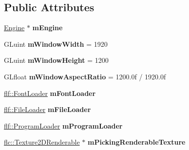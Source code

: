\subsection*{Public Attributes}
\begin{DoxyCompactItemize}
\item 
\hyperlink{classflw_1_1Engine}{Engine} $\ast$ {\bfseries m\+Engine}\hypertarget{structflw_1_1Engine_1_1EngineImpl_a9c64f8ee7c6ac8835080287ed3367c3f}{}\label{structflw_1_1Engine_1_1EngineImpl_a9c64f8ee7c6ac8835080287ed3367c3f}

\item 
G\+Luint {\bfseries m\+Window\+Width} = 1920\hypertarget{structflw_1_1Engine_1_1EngineImpl_aef610baed5ac54f136ecfdc97e1683aa}{}\label{structflw_1_1Engine_1_1EngineImpl_aef610baed5ac54f136ecfdc97e1683aa}

\item 
G\+Luint {\bfseries m\+Window\+Height} = 1200\hypertarget{structflw_1_1Engine_1_1EngineImpl_a9e20cc9b2d108f04c78fbc4471871e70}{}\label{structflw_1_1Engine_1_1EngineImpl_a9e20cc9b2d108f04c78fbc4471871e70}

\item 
G\+Lfloat {\bfseries m\+Window\+Aspect\+Ratio} = 1200.\+0f / 1920.\+0f\hypertarget{structflw_1_1Engine_1_1EngineImpl_a46ed363e1a45b86fb9390037b7fc70a6}{}\label{structflw_1_1Engine_1_1EngineImpl_a46ed363e1a45b86fb9390037b7fc70a6}

\item 
\hyperlink{classflw_1_1flf_1_1FontLoader}{flf\+::\+Font\+Loader} {\bfseries m\+Font\+Loader}\hypertarget{structflw_1_1Engine_1_1EngineImpl_aa2518f4952d54afbc00d0c929ffd415c}{}\label{structflw_1_1Engine_1_1EngineImpl_aa2518f4952d54afbc00d0c929ffd415c}

\item 
\hyperlink{classflw_1_1flf_1_1FileLoader}{flf\+::\+File\+Loader} {\bfseries m\+File\+Loader}\hypertarget{structflw_1_1Engine_1_1EngineImpl_afb036e6ebe80cb31685cef3755f400ce}{}\label{structflw_1_1Engine_1_1EngineImpl_afb036e6ebe80cb31685cef3755f400ce}

\item 
\hyperlink{classflw_1_1flf_1_1ProgramLoader}{flf\+::\+Program\+Loader} {\bfseries m\+Program\+Loader}\hypertarget{structflw_1_1Engine_1_1EngineImpl_a6d3acddc158c0d8d4a6a62539a1ebcdd}{}\label{structflw_1_1Engine_1_1EngineImpl_a6d3acddc158c0d8d4a6a62539a1ebcdd}

\item 
\hyperlink{classflw_1_1flc_1_1Texture2DRenderable}{flc\+::\+Texture2\+D\+Renderable} $\ast$ {\bfseries m\+Picking\+Renderable\+Texture}\hypertarget{structflw_1_1Engine_1_1EngineImpl_aa55b1ccd3c1ab1b2b84eee7c481a9f8d}{}\label{structflw_1_1Engine_1_1EngineImpl_aa55b1ccd3c1ab1b2b84eee7c481a9f8d}


\end{DoxyCompactItemize}
